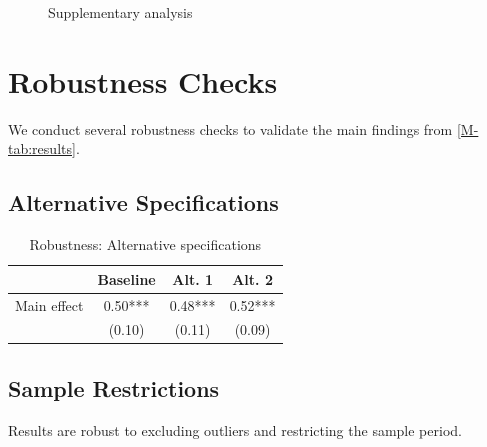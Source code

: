\documentclass[12pt, draft, colorlinks, doublespace, onlineappendix]{bp-article}
\begin{document}
\begin{figure}[htbp]
    \centering
    \caption{Supplementary analysis}
    \label{fig:supplementary}
\end{figure}


\section{Robustness Checks} \label{sec:robustness}

We conduct several robustness checks to validate the main findings from \cref{M-tab:results}.

\subsection{Alternative Specifications} \label{subsec:altspec}

\begin{table}[htbp]
    \centering
    \caption{Robustness: Alternative specifications}
    \label{tab:robustness}
    \begin{tabular}{lccc}
        \toprule
        & Baseline & Alt. 1 & Alt. 2 \\
        \midrule
        Main effect & 0.50*** & 0.48*** & 0.52*** \\
                    & (0.10)  & (0.11)  & (0.09) \\
        \bottomrule
    \end{tabular}
\end{table}

\subsection{Sample Restrictions} \label{subsec:sample}

Results are robust to excluding outliers and restricting the sample period.


\end{document}
